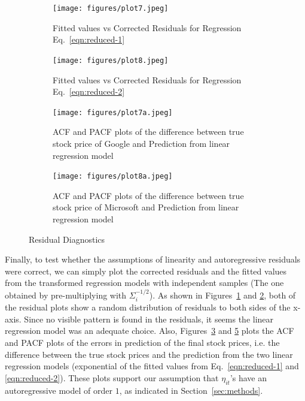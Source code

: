 \documentclass[11pt, a4paper]{article}
\begin{document}
\begin{figure}[ht]
    \centering
    \begin{subfigure}{0.47\textwidth}
       \centering
       \texttt{[image: figures/plot7.jpeg]}
       \caption{Fitted values vs Corrected Residuals for Regression Eq.~\eqref{eqn:reduced-1}}
       \label{fig:residuals-google}
    \end{subfigure}
    \hfill
    \begin{subfigure}{0.47\textwidth}
       \centering
       \texttt{[image: figures/plot8.jpeg]}
       \caption{Fitted values vs Corrected Residuals for Regression Eq.~\eqref{eqn:reduced-2}}
       \label{fig:residuals-microsoft}
    \end{subfigure}
    \begin{subfigure}{0.47\textwidth}
       \centering
       \texttt{[image: figures/plot7a.jpeg]}
       \caption{ACF and PACF plots of the difference between true stock price of Google and Prediction from linear regression model}
       \label{fig:acf-google}
    \end{subfigure}
    \hfill
    \begin{subfigure}{0.47\textwidth}
       \centering
       \texttt{[image: figures/plot8a.jpeg]}
       \caption{ACF and PACF plots of the difference between true stock price of Microsoft and Prediction from linear regression model}
       \label{fig:acf-microsoft}
    \end{subfigure}
    \caption{Residual Diagnostics}
\end{figure}

Finally, to test whether the assumptions of linearity and autoregressive residuals were correct, we can simply plot the corrected residuals and the fitted values from the transformed regression models with independent samples (The one obtained by pre-multiplying with $\Sigma_i^{-1/2}$). As shown in Figures~\ref{fig:residuals-google} and \ref{fig:residuals-microsoft}, both of the residual plots show a random distribution of residuals to both sides of the x-axis. Since no visible pattern is found in the residuals, it seems the linear regression model was an adequate choice. Also, Figures~\ref{fig:acf-google} and \ref{fig:acf-microsoft} plots the ACF and PACF plots of the errors in prediction of the final stock prices, i.e. the difference between the true stock prices and the prediction from the two linear regression models (exponential of the fitted values from Eq.~\eqref{eqn:reduced-1} and \eqref{eqn:reduced-2}). These plots support our assumption that $\eta_{it}$'s have an autoregressive model of order $1$, as indicated in Section~\ref{sec:methods}.
\end{document}

